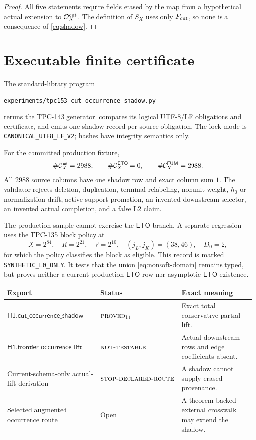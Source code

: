 \documentclass[11pt]{article}
\theoremstyle{definition}
\theoremstyle{remark}
\newcommand{\ETO}{\mathsf{ETO}}
\newcommand{\FUM}{\mathsf{FUM}}
\newcommand{\Cns}{\mathcal C_X^{\rm ns}}
\newcommand{\Ocut}{\mathcal O_X^{\rm cut}}
\newcommand{\NT}{\textnormal{\textsc{not-testable}}}
\newcommand{\PROVED}{\textnormal{\textsc{proved}}}
\newcommand{\STOP}{\textnormal{\textsc{stop-declared-route}}}
\newcommand{\Lone}{\mathrm{L1}}
\newcommand{\Ltwo}{\mathrm{L2}}
\begin{document}
\begin{proof}
All five statements require fields erased by the map from a
hypothetical actual extension to \(\Ocut\).  The definition of
\(S_X\) uses only \(F_{\rm cut}\), so none is a consequence of
\eqref{eq:shadow}.
\end{proof}

\section{Executable finite certificate}

The standard-library program
\begin{center}
\small
\texttt{experiments/tpc153\_cut\_occurrence\_shadow.py}
\end{center}
reruns the TPC-143 generator, compares its logical UTF-8/LF
obligations and certificate, and emits one shadow record per source
obligation.  The lock mode is
\texttt{CANONICAL\_UTF8\_LF\_V2}; hashes have integrity semantics
only.

For the committed production fixture,
\[
 \#\Cns=2988,\qquad
 \#\mathcal C_X^{\ETO}=0,\qquad
 \#\mathcal C_X^{\FUM}=2988.
\]
All \(2988\) source columns have one shadow row and exact column sum
\(1\).  The validator rejects deletion, duplication, terminal
relabeling, nonunit weight, \(h_0\) or normalization drift, active
support promotion, an invented downstream selector, an invented
actual completion, and a false \(\Ltwo\) claim.

The production sample cannot exercise the \(\ETO\) branch.  A
separate regression uses the TPC-135 block policy at
\[
 X=2^{84},\quad R=2^{21},\quad V=2^{10},\quad
 (j_L,j_K)=(38,46),\quad D_0=2,
\]
for which the policy classifies the block as eligible.  This record is
marked \texttt{SYNTHETIC\_L0\_ONLY}.  It tests that the union
\eqref{eq:nonsoft-domain} remains typed, but proves neither a current
production \(\ETO\) row nor asymptotic \(\ETO\) existence.

\begin{center}
\small
\begin{tabularx}{\textwidth}{@{}P{0.38\textwidth}P{0.23\textwidth}Y@{}}
\toprule
Export & Status & Exact meaning\\
\midrule
\(\mathsf{H1.cut\_occurrence\_shadow}\)
& \(\PROVED_{\Lone}\) & Exact total conservative partial lift.\\
\(\mathsf{H1.frontier\_occurrence\_lift}\)
& \(\NT\) & Actual downstream rows and edge coefficients absent.\\
Current-schema-only actual-lift derivation
& \(\STOP\) & A shadow cannot supply erased provenance.\\
Selected augmented occurrence route
& Open & A theorem-backed external crosswalk may extend the shadow.\\
\bottomrule
\end{tabularx}
\end{center}
\end{document}
